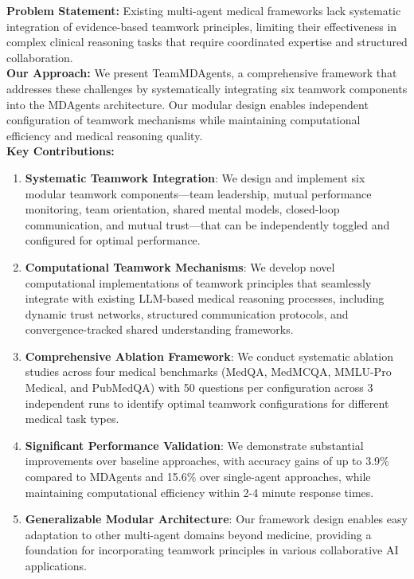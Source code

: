 \documentclass[letterpaper]{article} %
\begin{document}
\textbf{Problem Statement:} Existing multi-agent medical frameworks lack systematic integration of evidence-based teamwork principles, limiting their effectiveness in complex clinical reasoning tasks that require coordinated expertise and structured collaboration.\\

\textbf{Our Approach:} We present TeamMDAgents, a comprehensive framework that addresses these challenges by systematically integrating six teamwork components into the MDAgents architecture. Our modular design enables independent configuration of teamwork mechanisms while maintaining computational efficiency and medical reasoning quality.\\

\textbf{Key Contributions:}
\begin{enumerate}
\item \textbf{Systematic Teamwork Integration}: We design and implement six modular teamwork components—team leadership, mutual performance monitoring, team orientation, shared mental models, closed-loop communication, and mutual trust—that can be independently toggled and configured for optimal performance.
\item \textbf{Computational Teamwork Mechanisms}: We develop novel computational implementations of teamwork principles that seamlessly integrate with existing LLM-based medical reasoning processes, including dynamic trust networks, structured communication protocols, and convergence-tracked shared understanding frameworks.
\item \textbf{Comprehensive Ablation Framework}: We conduct systematic ablation studies across four medical benchmarks (MedQA, MedMCQA, MMLU-Pro Medical, and PubMedQA) with 50 questions per configuration across 3 independent runs to identify optimal teamwork configurations for different medical task types.
\item \textbf{Significant Performance Validation}: We demonstrate substantial improvements over baseline approaches, with accuracy gains of up to 3.9\% compared to MDAgents and 15.6\% over single-agent approaches, while maintaining computational efficiency within 2-4 minute response times.
\item \textbf{Generalizable Modular Architecture}: Our framework design enables easy adaptation to other multi-agent domains beyond medicine, providing a foundation for incorporating teamwork principles in various collaborative AI applications.
\end{enumerate}
\end{document}
